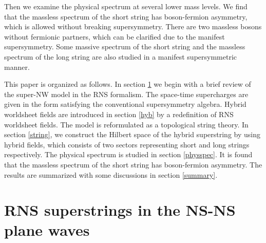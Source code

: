 \documentclass[a4paper,seceq,preprint]{ptptex}
\begin{document}
Then we examine the physical spectrum at several lower mass levels.
We find that the massless spectrum of the short string
has boson-fermion asymmetry, which is allowed without breaking
supersymmetry. There are two massless bosons without fermionic
partners, which can be clarified due to the manifest 
supersymmetry. Some massive spectrum of the short string 
and the massless spectrum of the long string 
are also studied in a manifest supersymmetric manner.

This paper is organized as follows. In section \ref{nsr} 
we begin with a brief review of the super-NW model 
in the RNS formalism. The space-time supercharges 
are given in the form satisfying the conventional 
supersymmetry algebra.
Hybrid worldsheet fields are introduced
in section \ref{hyb} by a redefinition of RNS worldsheet 
fields. The model is reformulated as a topological \coordHE{} 
string theory.
In section \ref{string}, we construct the Hilbert space 
of the hybrid superstring by using hybrid fields, 
which consists of two sectors representing short and long 
strings respectively. The physical spectrum is studied 
in section \ref{physspec}. It is found that the massless 
spectrum of the short string has boson-fermion asymmetry. 
The results are summarized with some discussions 
in section \ref{summary}.

\section{RNS superstrings in the NS-NS plane waves}\label{nsr}
\end{document}

